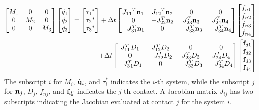 \begin{eqnarray}
\label{eq:changemotionequations4}
\left[\begin{matrix}M_1  & 0 & 0 \\ 0 & M_2 & 0 \\ 0 & 0 &
    M_3\end{matrix}\right]\left[\begin{matrix}\dot{q_1} \\ \dot{q_2}
    \\ \dot{q_3}\end{matrix}\right] = \left[\begin{matrix}{\tau_1}^*
    \\ {\tau_2}^* \\ {\tau_3}^*\end{matrix}\right] +
\Delta{t}\left[\begin{matrix}{J_{11}}^T\mathbf{n}_1 &
    {J_{12}}^T\mathbf{n}_2 & 0 & 0 \\ 0 & -J_{22}^T\mathbf{n}_2 & J_{23}^T
    \mathbf{n}_3 & J_{24}^T \mathbf{n}_4 \\ -J_{31}^T \mathbf{n}_1 & 0 & -J_{33}^T
    \mathbf{n}_3 & -J_{34}^T
    \mathbf{n}_4 \end{matrix}\right]\left[\begin{matrix}f_{n1} \\ f_{n2}
    \\ f_{n3} \\ f_{n4} \end{matrix}\right] \nonumber \\ +
\Delta{t}\left[\begin{matrix}J_{11}^T D_1 &
    J_{12}^TD_2 & 0 & 0 \\ 0 & -J_{22}^TD_2 & J_{23}^T
    D_3 & J_{24}^T D_4 \\ -J_{31}^T D_1 & 0 & -J_{33}^T
    D_3 & -J_{34}^T
    D_4 \end{matrix}\right]\left[\begin{matrix}\mathbf{f}_{d1} \\ \mathbf{f}_{d2} \\
    \mathbf{f}_{d3} \\ \mathbf{f}_{d4}\end{matrix}\right]
\end{eqnarray}
The subscript $i$ for $M_i$, $\dot{\mathbf{q}}_i$, and $\tau^*_i$ indicates the
$i$-th system, while the subscript $j$ for $\mathbf{n}_j$, $D_j$, $f_{nj}$,
and $\mathbf{f}_{dj}$ indicates the $j$-th contact. A Jacobian matrix
$J_{ij}$ has two subscripts indicating the Jacobian evaluated at
contact $j$ for the system $i$. 

